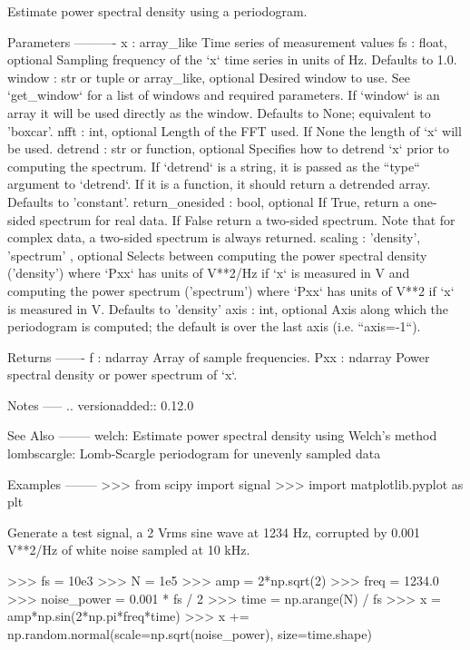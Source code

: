 \begin{DoxyVerb}Estimate power spectral density using a periodogram.

Parameters
----------
x : array_like
    Time series of measurement values
fs : float, optional
    Sampling frequency of the `x` time series in units of Hz. Defaults
    to 1.0.
window : str or tuple or array_like, optional
    Desired window to use. See `get_window` for a list of windows and
    required parameters. If `window` is an array it will be used
    directly as the window. Defaults to None; equivalent to 'boxcar'.
nfft : int, optional
    Length of the FFT used. If None the length of `x` will be used.
detrend : str or function, optional
    Specifies how to detrend `x` prior to computing the spectrum. If
    `detrend` is a string, it is passed as the ``type`` argument to
    `detrend`. If it is a function, it should return a detrended array.
    Defaults to 'constant'.
return_onesided : bool, optional
    If True, return a one-sided spectrum for real data. If False return
    a two-sided spectrum. Note that for complex data, a two-sided
    spectrum is always returned.
scaling : { 'density', 'spectrum' }, optional
    Selects between computing the power spectral density ('density')
    where `Pxx` has units of V**2/Hz if `x` is measured in V and computing
    the power spectrum ('spectrum') where `Pxx` has units of V**2 if `x` is
    measured in V. Defaults to 'density'
axis : int, optional
    Axis along which the periodogram is computed; the default is over
    the last axis (i.e. ``axis=-1``).

Returns
-------
f : ndarray
    Array of sample frequencies.
Pxx : ndarray
    Power spectral density or power spectrum of `x`.

Notes
-----
.. versionadded:: 0.12.0

See Also
--------
welch: Estimate power spectral density using Welch's method
lombscargle: Lomb-Scargle periodogram for unevenly sampled data

Examples
--------
>>> from scipy import signal
>>> import matplotlib.pyplot as plt

Generate a test signal, a 2 Vrms sine wave at 1234 Hz, corrupted by
0.001 V**2/Hz of white noise sampled at 10 kHz.

>>> fs = 10e3
>>> N = 1e5
>>> amp = 2*np.sqrt(2)
>>> freq = 1234.0
>>> noise_power = 0.001 * fs / 2
>>> time = np.arange(N) / fs
>>> x = amp*np.sin(2*np.pi*freq*time)
>>> x += np.random.normal(scale=np.sqrt(noise_power), size=time.shape)


\end{DoxyVerb}
